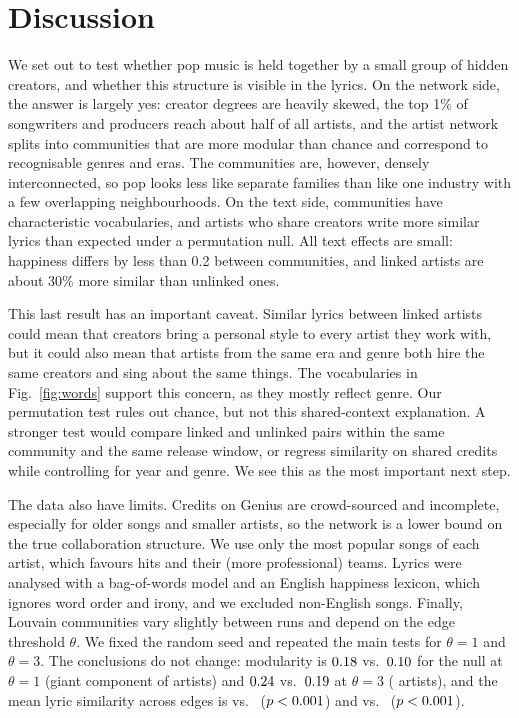 \documentclass[9pt,twocolumn,twoside]{pnas-new}
\begin{document}
\section*{Discussion}
We set out to test whether pop music is held together by a small group of hidden creators, and whether this structure is visible in the lyrics. On the network side, the answer is largely yes: creator degrees are heavily skewed, the top 1\% of songwriters and producers reach about half of all artists, and the artist network splits into communities that are more modular than chance and correspond to recognisable genres and eras. The communities are, however, densely interconnected, so pop looks less like separate families than like one industry with a few overlapping neighbourhoods. On the text side, communities have characteristic vocabularies, and artists who share creators write more similar lyrics than expected under a permutation null. All text effects are small: happiness differs by less than 0.2 between communities, and linked artists are about 30\% more similar than unlinked ones.

This last result has an important caveat. Similar lyrics between linked artists could mean that creators bring a personal style to every artist they work with, but it could also mean that artists from the same era and genre both hire the same creators and sing about the same things. The vocabularies in Fig.~\ref{fig:words} support this concern, as they mostly reflect genre. Our permutation test rules out chance, but not this shared-context explanation. A stronger test would compare linked and unlinked pairs within the same community and the same release window, or regress similarity on shared credits while controlling for year and genre. We see this as the most important next step.

The data also have limits. Credits on Genius are crowd-sourced and incomplete, especially for older songs and smaller artists, so the network is a lower bound on the true collaboration structure. We use only the most popular songs of each artist, which favours hits and their (more professional) teams. Lyrics were analysed with a bag-of-words model and an English happiness lexicon, which ignores word order and irony, and we excluded non-English songs. Finally, Louvain communities vary slightly between runs and depend on the edge threshold $\theta$. We fixed the random seed and repeated the main tests for $\theta=1$ and $\theta=3$. The conclusions do not change: modularity is $0.18$ vs.\ $0.10$ for the null at $\theta=1$ (giant component of \ThetaOneGiant{} artists) and $0.24$ vs.\ $0.19$ at $\theta=3$ (\ThetaThreeGiant{} artists), and the mean lyric similarity across edges is \ThetaOneSimObs{} vs.\ \ThetaOneSimNull{} ($p<0.001$) and \ThetaThreeSimObs{} vs.\ \ThetaThreeSimNull{} ($p<0.001$).
\end{document}
